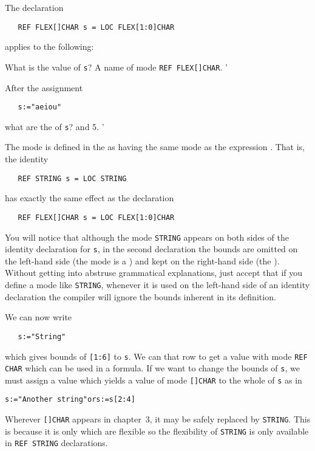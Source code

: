 \begin{exercise}
\item The declaration
\begin{verbatim}
   REF FLEX[]CHAR s = LOC FLEX[1:0]CHAR
\end{verbatim}
\noindent
applies to the following:
\begin{subex}
\item What is the value of \verb|s|? \subans A name of mode
\verb|REF FLEX[]CHAR|.
'
\item After the assignment
\begin{verbatim}
   s:="aeiou"
\end{verbatim}
\noindent
what are the  of \verb|s|?  and 5.
'
\end{subex}
\end{exercise}

The mode  is defined in the  as
having the same mode as the expression
. That is, the
identity 
\begin{verbatim}
   REF STRING s = LOC STRING
\end{verbatim}
\noindent
has exactly the same effect as the declaration
\begin{verbatim}
   REF FLEX[]CHAR s = LOC FLEX[1:0]CHAR
\end{verbatim}
\noindent
You will notice that although the mode 
\verb|STRING| appears on both sides of the identity declaration for
\verb|s|, in the second declaration the bounds are omitted on the
left-hand side (the mode is a ) and kept on the
right-hand side (the ).  Without getting into
abstruse grammatical explanations, just accept that if you define a
mode like \verb|STRING|, whenever it is used on the left-hand side of
an identity declaration the compiler will ignore the bounds inherent
in its definition.

We can now write
\begin{verbatim}
   s:="String"
\end{verbatim}
\noindent
which gives bounds of \verb|[1:6]| to \verb|s|.  We can
 that row to get a value with mode \verb|REF CHAR|
which can be used in a formula. If we want to change the bounds of
\verb|s|, we must assign a value which yields a value of mode
\verb|[]CHAR| to the whole of \verb|s| as in
\begin{center}
\texttt{s:="Another string"\quad\textrm{or}\quad s:=s[2:4]}
\end{center}
Wherever \verb|[]CHAR| appears in chapter~3, it may be safely
replaced by \verb|STRING|. This is because it is only
 which are flexible so the flexibility of
\verb|STRING| is only available in \verb|REF STRING| declarations.

